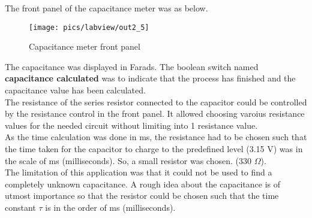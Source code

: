 \noindent
The front panel of the capacitance meter  was as below.

\begin{figure}[!h]
	\centering
	\texttt{[image: pics/labview/out2\_5]}
	\caption{Capacitance meter front panel}
	\label{fig:out24}
\end{figure}

\noindent
The capacitance was displayed in Farads. The boolean switch named \textbf{capacitance calculated} was to indicate that the process has finished and the  capacitance value has been calculated. \\

\noindent
The resistance of the series  resistor connected to the capacitor could be controlled by the resistance control in the front panel. It allowed choosing varoius resistance values for the needed circuit without limiting into 1 resistance value.\\

\noindent
As the time calculation was done in ms, the resistance had to be chosen such that the time taken for the capacitor to charge to the predefined level (3.15 V) was in the scale of ms (milliseconds). So, a small resistor was chosen. (330 $ \Omega $).\\

\noindent
The limitation of this application was that it could not be used to find a completely unknown capacitance. A rough idea about the capacitance is of utmost importance so that the resistor could be chosen such that the time constant $ \tau $ is in the order of ms (milliseconds).

\pagebreak